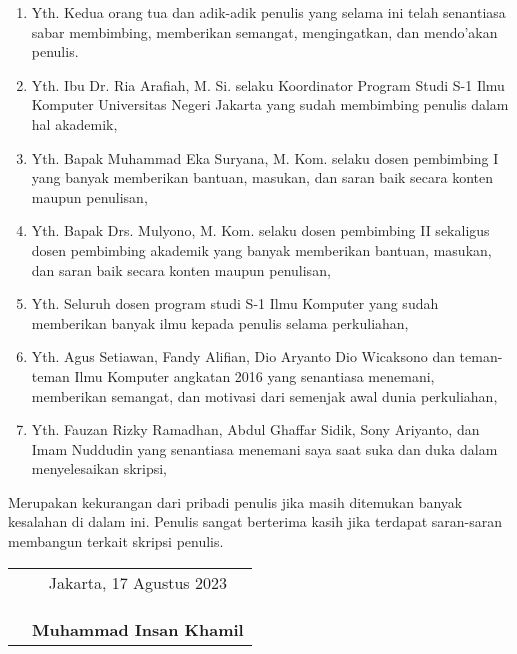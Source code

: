 \documentclass{jtetiskripsi}
\begin{document}
\begin{enumerate}
	\item Yth. Kedua orang tua dan adik-adik penulis yang selama ini telah senantiasa sabar membimbing, memberikan semangat, mengingatkan, dan mendo’akan penulis.
	\item Yth. Ibu Dr. Ria Arafiah, M. Si. selaku Koordinator Program Studi S-1 Ilmu Komputer Universitas Negeri Jakarta  yang sudah membimbing penulis dalam hal akademik,
	\item Yth. Bapak Muhammad Eka Suryana, M. Kom. selaku dosen pembimbing I yang banyak memberikan bantuan, masukan, dan saran baik secara konten maupun penulisan,
	\item Yth. Bapak Drs. Mulyono, M. Kom. selaku dosen pembimbing II sekaligus dosen pembimbing akademik yang banyak memberikan bantuan, masukan, dan saran baik secara konten maupun penulisan,
	\item Yth. Seluruh dosen program studi S-1 Ilmu Komputer yang sudah memberikan banyak ilmu kepada penulis selama perkuliahan,
	\item Yth. Agus Setiawan, Fandy Alifian, Dio Aryanto Dio Wicaksono dan teman-teman Ilmu Komputer angkatan 2016 yang senantiasa menemani, memberikan semangat, dan motivasi dari semenjak awal dunia perkuliahan,
	\item Yth. Fauzan Rizky Ramadhan, Abdul Ghaffar Sidik, Sony Ariyanto, dan Imam Nuddudin yang senantiasa menemani saya saat suka dan duka dalam menyelesaikan skripsi,
\end{enumerate}

Merupakan kekurangan dari pribadi penulis jika masih ditemukan banyak kesalahan di dalam ini. Penulis sangat berterima kasih jika terdapat saran-saran membangun terkait skripsi penulis.

\vspace{.5cm}

\begin{tabular}{p{7.5cm}c}
	&Jakarta, 17 Agustus 2023\\
	&\\
	&\\
	&\\
	&\textbf{Muhammad Insan Khamil}
\end{tabular}

\tableofcontents 
{}
\listoftables
{}
\listoffigures
{}
\pagestyle{chapterheading}
\end{document}
